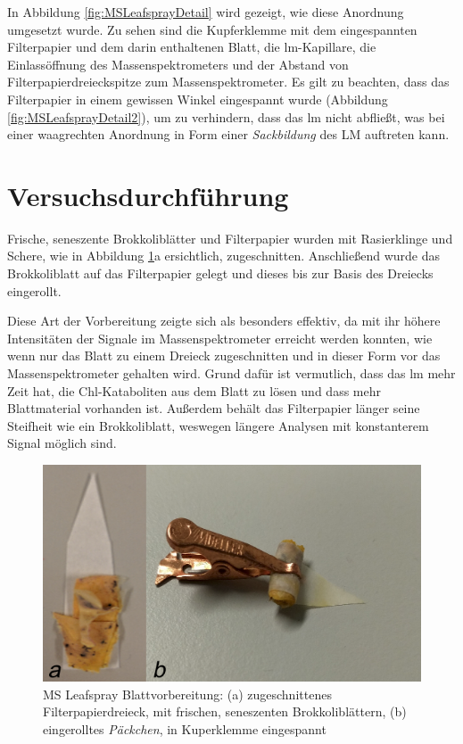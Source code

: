 In Abbildung \ref{fig:MSLeafsprayDetail} wird gezeigt, wie diese Anordnung umgesetzt wurde. Zu sehen sind die Kupferklemme mit dem eingespannten Filterpapier und dem darin enthaltenen Blatt, die \gls{lm}-Kapillare, die Einlassöffnung des Massenspektrometers und der Abstand von Filterpapierdreieckspitze zum Massenspektrometer. Es gilt zu beachten, dass das Filterpapier in einem gewissen Winkel eingespannt wurde (Abbildung \ref{fig:MSLeafsprayDetail2}), um zu verhindern, dass das \gls{lm} nicht abfließt, was bei einer waagrechten Anordnung in Form einer \textit{Sackbildung} des LM auftreten kann.

\pagebreak
\section{Versuchsdurchführung} \label{sec:Versuchsdurchfuehrung}

Frische, seneszente Brokkoliblätter und Filterpapier wurden mit Rasierklinge und Schere, wie in Abbildung \ref{fig:LeafsprayVorbereitung}a ersichtlich, zugeschnitten. Anschließend wurde das Brokkoliblatt auf das Filterpapier gelegt und dieses bis zur Basis des Dreiecks eingerollt. 

Diese Art der Vorbereitung zeigte sich als besonders effektiv, da mit ihr höhere Intensitäten der Signale im Massenspektrometer erreicht werden konnten, wie wenn nur das Blatt zu einem Dreieck zugeschnitten und in dieser Form vor das Massenspektrometer gehalten wird. Grund dafür ist vermutlich, dass das \gls{lm} mehr Zeit hat, die Chl-Kataboliten aus dem Blatt zu lösen und dass mehr Blattmaterial vorhanden ist. Außerdem behält das Filterpapier länger seine Steifheit wie ein Brokkoliblatt, weswegen längere Analysen mit konstanterem Signal möglich sind.

\begin{figure}[hbtp]
  \centering
  \includegraphics[scale=0.5]{figures/Kapitel4/VWA_MSLeafspray_Blattvobereitung_zwei.png}
  \caption[MS Leafspray Blattvorbereitung, Quelle: Autor]{MS Leafspray Blattvorbereitung: (a) zugeschnittenes Filterpapierdreieck, mit frischen, seneszenten Brokkoliblättern, (b) eingerolltes \textit{Päckchen}, in Kuperklemme eingespannt}
  \label{fig:LeafsprayVorbereitung}
\end{figure}

